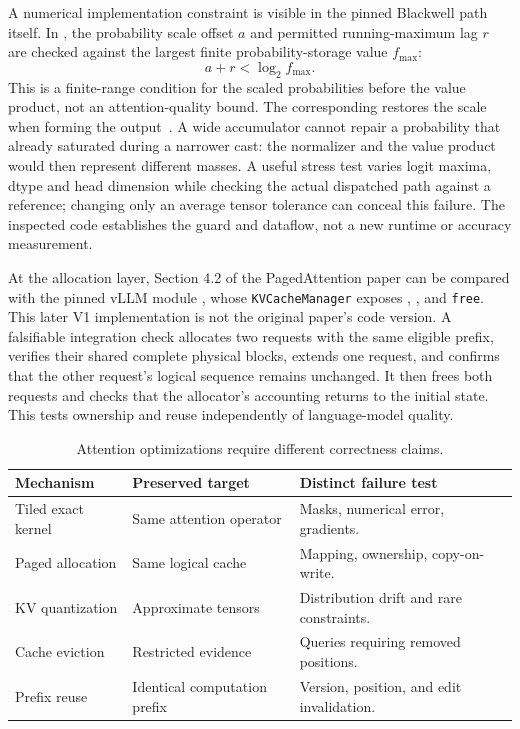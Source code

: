A numerical implementation constraint is visible in the pinned Blackwell path itself. In , the probability scale offset $a$ and permitted running-maximum lag $r$ are checked against the largest finite probability-storage value $f_{\max}$:
\begin{equation}
 a+r<\log_2 f_{\max}.
\end{equation}
This is a finite-range condition for the scaled probabilities before the value product, not an attention-quality bound. The corresponding  restores the scale when forming the output~\cite{repo_flashattention}. A wide accumulator cannot repair a probability that already saturated during a narrower cast: the normalizer and the value product would then represent different masses. A useful stress test varies logit maxima, dtype and head dimension while checking the actual dispatched path against a reference; changing only an average tensor tolerance can conceal this failure. The inspected code establishes the guard and dataflow, not a new runtime or accuracy measurement.

At the allocation layer, Section 4.2 of the PagedAttention paper can be compared with the pinned vLLM module , whose \texttt{KVCacheManager} exposes , , and \texttt{free}. This later V1 implementation is not the original paper's code version. A falsifiable integration check allocates two requests with the same eligible prefix, verifies their shared complete physical blocks, extends one request, and confirms that the other request's logical sequence remains unchanged. It then frees both requests and checks that the allocator's accounting returns to the initial state. This tests ownership and reuse independently of language-model quality.

{\small\setlength{\tabcolsep}{3pt}
\begin{table}[!htbp]
\centering
\caption{Attention optimizations require different correctness claims.}\label{tab:C04:claims}
\begin{tabular}{L{27mm}L{39mm}L{40mm}}

\toprule Mechanism & Preserved target & Distinct failure test\\\midrule
Tiled exact kernel & Same attention operator & Masks, numerical error, gradients.\\
Paged allocation & Same logical cache & Mapping, ownership, copy-on-write.\\
KV quantization & Approximate tensors & Distribution drift and rare constraints.\\
Cache eviction & Restricted evidence & Queries requiring removed positions.\\
Prefix reuse & Identical computation prefix & Version, position, and edit invalidation.\\
\bottomrule
\end{tabular}
\end{table}
}

